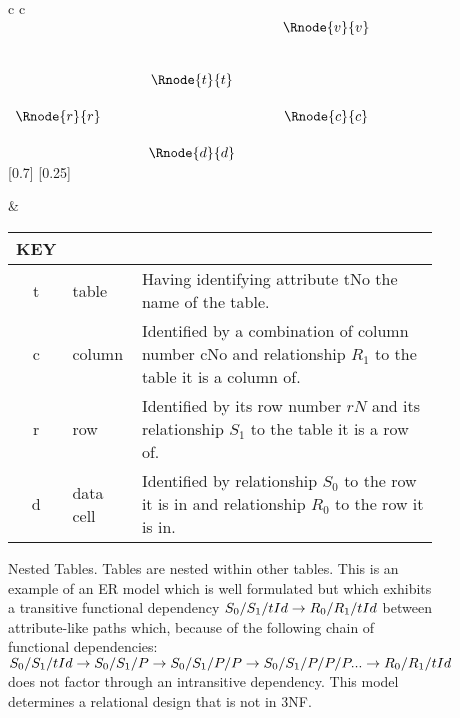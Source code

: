 \begin{figure} [h] %
\begin{center}

\begin{tabular}{c c}
$
\begin{array}{cp{0.5cm}cp{0.5cm}cp{0.3cm}c}
            &&              && \Rnode{v}{v} &&              \\[0.9cm]
            && \Rnode{t}{t} &&              &&              \\[0.5cm] 
\Rnode{r}{r}&&              && \Rnode{c}{c} &&              \\[0.5cm]     
	          && \Rnode{d}{d} &&              &&               
\end{array}
$
[0.7]
\idcomp
{} 
\idcomp
{} 
\idcomp
{}
\idcomp
{}
\idcomp
{}
\idcomp
[0.25]
\idcomp

& \footnotesize
\begin{tabular}{c p{1.5cm} p{3cm}}
KEY && \\
\hline
t & table & Having identifying attribute tNo the name of the table. \\
c & column & Identified by a combination of column number cNo and relationship $R_1$ to the table it is a column of.\\
r & row & Identified by its row number $rN$ and its relationship $S_1$ to the table it is a row of.\\
d & data cell & Identified by relationship $S_0$ to the row it is in and relationship $R_0$ to the row it is in. \\
\end{tabular} 
\end{tabular}
\end{center}
\caption{Nested Tables. Tables are nested within other tables. This is an example of an ER model which is well formulated but which exhibits a transitive functional dependency
$S_0/S_1/tId \rightarrow R_0/R_1/tId$
between attribute-like paths which, because of the following chain of functional dependencies:
$
S_0/S_1/tId \rightarrow S_0/S_1/P \rightarrow S_0/S_1/P/P \rightarrow S_0/S_1/P/P/P  ... \rightarrow R_0/R_1/tId
$
does not factor through an intransitive dependency. This model determines a relational design that is not in 3NF. 
}
\label{datatablegraph}
\end{figure}

